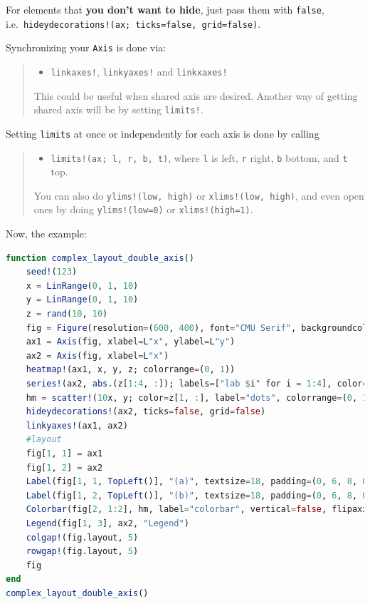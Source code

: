 \documentclass[
  notoc %
]{tufte-book}
\providecommand{\tightlist}{%
  \setlength{\itemsep}{0pt}\setlength{\parskip}{0pt}
}
\newcommand{\passthrough}[1]{#1}
\begin{document}
For elements that \textbf{you don't want to hide}, just pass them with
\passthrough{\lstinline!false!},
i.e.~\passthrough{\lstinline"hideydecorations!(ax; ticks=false, grid=false)"}.

Synchronizing your \passthrough{\lstinline!Axis!} is done via:

\begin{quote}
\begin{itemize}
\tightlist
\item
  \passthrough{\lstinline"linkaxes!"},
  \passthrough{\lstinline"linkyaxes!"} and
  \passthrough{\lstinline"linkxaxes!"}
\end{itemize}

This could be useful when shared axis are desired. Another way of
getting shared axis will be by setting
\passthrough{\lstinline"limits!"}.
\end{quote}

Setting \passthrough{\lstinline!limits!} at once or independently for
each axis is done by calling

\begin{quote}
\begin{itemize}
\tightlist
\item
  \passthrough{\lstinline"limits!(ax; l, r, b, t)"}, where
  \passthrough{\lstinline!l!} is left, \passthrough{\lstinline!r!}
  right, \passthrough{\lstinline!b!} bottom, and
  \passthrough{\lstinline!t!} top.
\end{itemize}

You can also do \passthrough{\lstinline"ylims!(low, high)"} or
\passthrough{\lstinline"xlims!(low, high)"}, and even open ones by doing
\passthrough{\lstinline"ylims!(low=0)"} or
\passthrough{\lstinline"xlims!(high=1)"}.
\end{quote}

Now, the example:

\begin{lstlisting}[language=Julia]
function complex_layout_double_axis()
    seed!(123)
    x = LinRange(0, 1, 10)
    y = LinRange(0, 1, 10)
    z = rand(10, 10)
    fig = Figure(resolution=(600, 400), font="CMU Serif", backgroundcolor=:grey90)
    ax1 = Axis(fig, xlabel=L"x", ylabel=L"y")
    ax2 = Axis(fig, xlabel=L"x")
    heatmap!(ax1, x, y, z; colorrange=(0, 1))
    series!(ax2, abs.(z[1:4, :]); labels=["lab $i" for i = 1:4], color=:Set1_4)
    hm = scatter!(10x, y; color=z[1, :], label="dots", colorrange=(0, 1))
    hideydecorations!(ax2, ticks=false, grid=false)
    linkyaxes!(ax1, ax2)
    #layout
    fig[1, 1] = ax1
    fig[1, 2] = ax2
    Label(fig[1, 1, TopLeft()], "(a)", textsize=18, padding=(0, 6, 8, 0))
    Label(fig[1, 2, TopLeft()], "(b)", textsize=18, padding=(0, 6, 8, 0))
    Colorbar(fig[2, 1:2], hm, label="colorbar", vertical=false, flipaxis=false)
    Legend(fig[1, 3], ax2, "Legend")
    colgap!(fig.layout, 5)
    rowgap!(fig.layout, 5)
    fig
end
complex_layout_double_axis()
\end{lstlisting}
\end{document}
